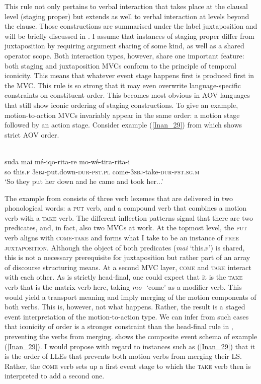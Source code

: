 This rule not only pertains to verbal interaction that takes place at the clausal level (staging proper) but extends as well to verbal interaction at levels beyond the clause. Those constructions are summarised under the label juxtaposition and will be briefly discussed in . I assume that instances of staging proper differ from juxtaposition by requiring argument sharing of some kind, as well as a shared operator scope. Both interaction types, however, share one important feature: both staging and juxtaposition MVCs conform to the principle of temporal iconicity. This means that whatever event stage happens first is produced first in the MVC. This rule is so strong that it may even overwrite language-specific constraints on constituent order. This becomes most obvious in AOV languages that still show iconic ordering of staging constructions. To give an example, motion-to-action MVCs invariably appear in the same order: a motion stage followed by an action stage. Consider example (\ref{Inan_29}) from  which shows strict AOV order.

\ea \label{Inan_29}
\\
\gll suda mai mé-iqo-rita-re mo-wé-tira-rita-i \\
so this.\textsc{f} 3\textsc{sbj}-put.down-\textsc{dur}-\textsc{pst}.\textsc{pl} come-3\textsc{sbj}-take-\textsc{dur}-\textsc{pst}.\textsc{sg}.\textsc{m} \\
\glft `So they put her down and he came and took her...' \\ 
\z

The example from  consists of three verb lexemes that are delivered in two phonological words: a \textsc{put} verb, and a compound verb that combines a motion verb with a \textsc{take} verb. The different inflection patterns signal that there are two predicates, and, in fact, also two MVCs at work. At the topmost level, the \textsc{put} verb aligns with \textsc{come-take} and forms what I take to be an instance of \textsc{free juxtaposition}. Although the object of both predicates (\textit{mai} `this.\textsc{f}') is shared, this is not a necessary prerequisite for juxtaposition but rather part of an array of discourse structuring means. At a second MVC layer, \textsc{come} and \textsc{take} interact with each other. As  is strictly head-final, one could expect that it is the \textsc{take} verb that is the matrix verb here, taking \textit{mo-} `come' as a modifier verb. This would yield a transport meaning and imply merging of the motion components of both verbs. This is, however, not what happens. Rather, the result is a staged event interpretation of the motion-to-action type. We can infer from such cases that iconicity of order is a stronger constraint than the head-final rule in , preventing the verbs from merging.  shows the composite event schema of example (\ref{Inan_29}). I would propose with regard to instances such as (\ref{Inan_29}) that it is the order of LLEs that prevents both motion verbs from merging their LS. Rather, the \textsc{come} verb sets up a first event stage to which the \textsc{take} verb then is interpreted to add a second one.

